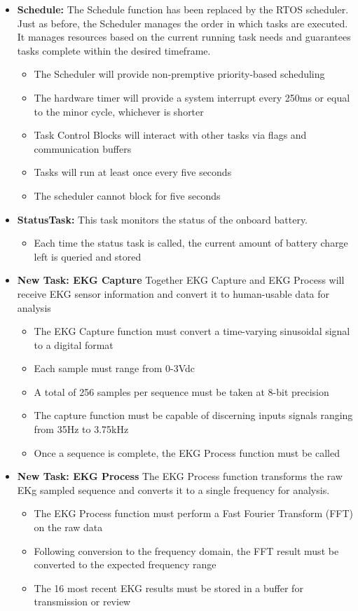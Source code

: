 \documentclass[12pt]{article} %
\begin{document}
\begin{itemize}
	\item \textbf{Schedule:}
		The Schedule function has been replaced by the RTOS scheduler. Just as
		before, the Scheduler manages the order in which tasks are executed. It
		manages resources based on the current running task needs and guarantees
		tasks complete within the desired timeframe.
    \begin{itemize}
			\item The Scheduler will provide non-premptive priority-based scheduling
      \item The hardware timer will provide a system interrupt every 250ms or
	equal to the minor cycle, whichever is shorter
      \item Task Control Blocks will interact with other tasks via flags and communication buffers
			\item Tasks will run at least once every five seconds
      \item The scheduler cannot block for five seconds
    \end{itemize}

	\item \textbf{StatusTask:}
		This task monitors the status of the onboard battery.
    \begin{itemize}
      \item Each time the status task is called, the current amount of battery charge left is queried and stored
    \end{itemize}

	\item \textbf{New Task: EKG Capture}
		Together EKG Capture and EKG Process will receive EKG sensor information
		and convert it to human-usable data for analysis
		\begin{itemize}
			\item The EKG Capture function must convert a time-varying sinusoidal signal to a digital format
			\item Each sample must range from 0-3Vdc
			\item A total of 256 samples per sequence must be taken at 8-bit precision
			\item The capture function must be capable of discerning inputs signals ranging from 35Hz to 3.75kHz
			\item Once a sequence is complete, the EKG Process function must be called
		\end{itemize}

	\item \textbf{New Task: EKG Process}
		The EKG Process function transforms the raw EKg sampled sequence and
		converts it to a single frequency for analysis.
		\begin{itemize}
			\item The EKG Process function must perform a Fast Fourier Transform (FFT) on the raw data
			\item Following conversion to the frequency domain, the FFT result must be converted to the expected frequency range
			\item The 16 most recent EKG results must be stored in a buffer for transmission or review
		\end{itemize}


\end{itemize}
\end{document}
